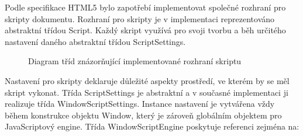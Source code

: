 Podle specifikace HTML5 bylo zapotřebí implementovat společné rozhraní pro skripty dokumentu. Rozhraní pro skripty je v implementaci reprezentováno abstraktní třídou Script. Každý skript využívá pro svoji tvorbu a běh určitého nastavení daného abstraktní třídou ScriptSettings. 

\begin{figure}[H]
  \begin{center}
    \caption{Diagram tříd znázorňující implementované rozhraní skriptu}
    \label{Figure.ScriptInterface}
  \end{center}
\end{figure}

Nastavení pro skripty deklaruje důležité aspekty prostředí, ve kterém by se měl skript vykonat. Třída ScriptSettings je abstraktní a v současné implementaci ji realizuje třída WindowScriptSettings. Instance nastavení je vytvářena vždy během konstrukce objektu Window, který je zároveň globálním objektem pro JavaScriptový engine. Třída WindowScriptEngine poskytuje referenci zejména na:


